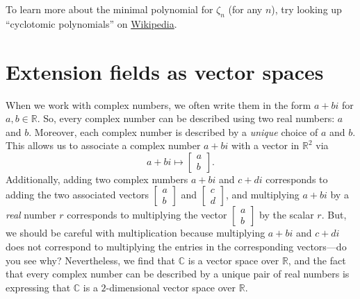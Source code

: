 To learn more about the minimal polynomial for $\zeta_n$ (for any $n$), try looking up ``cyclotomic polynomials'' on \href{https://en.wikipedia.org/wiki/Cyclotomic_polynomial}{Wikipedia}.

\section{Extension fields as vector spaces}

When we work with complex numbers, we often write them in the form $a+bi$ for $a,b\in \mathbb{R}$. So, every complex number can be described using two real numbers: $a$ and $b$. Moreover, each complex number is described by a \emph{unique} choice of $a$ and $b$. This allows us to associate a complex number $a+bi$ with a vector in $\mathbb{R}^2$ via
\[ a+bi\mapsto \begin{bmatrix} a\\b\end{bmatrix}.\]
Additionally, adding two complex numbers $a+bi$ and $c+di$ corresponds to adding the two associated vectors $\left[\begin{smallmatrix} a\\b\end{smallmatrix}\right]$ and $\left[\begin{smallmatrix} c\\d\end{smallmatrix}\right]$, and multiplying $a+bi$ by a \emph{real} number $r$ corresponds to multiplying the vector $\left[\begin{smallmatrix} a\\b\end{smallmatrix}\right]$ by the scalar $r$. But, we should be careful with multiplication because multiplying $a+bi$ and $c+di$ does not correspond to multiplying the entries in the corresponding vectors---do you see why? Nevertheless, we find that $\mathbb{C}$ is a vector space over $\mathbb{R}$, and the fact that every complex number can be described by a unique pair of real numbers is expressing that $\mathbb{C}$ is a $2$-dimensional vector space over $\mathbb{R}$. 

